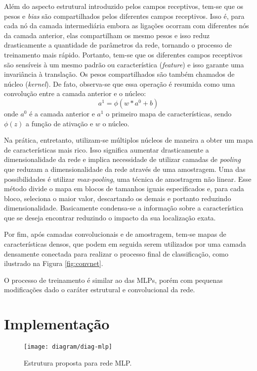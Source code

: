 Além do aspecto estrutural introduzido pelos campos receptivos, tem-se que os pesos e \textit{bias} são compartilhados pelos diferentes campos receptivos. Isso é, para cada nó da camada intermediária embora as ligações ocorram com diferentes nós da camada anterior, elas compartilham os mesmo pesos e isso reduz drasticamente a quantidade de parâmetros da rede, tornando o processo de treinamento mais rápido. Portanto, tem-se que os diferentes campos receptivos são sensíveis à um mesmo padrão ou característica (\textit{feature}) e isso garante uma invariância à translação. Os pesos compartilhados são também chamados de núcleo (\textit{kernel}). De fato, observa-se que essa operação é resumida como uma convolução entre a camada anterior e o núcleo:
\begin{equation}
a^1 = \phi(w \ast a^0 + b) 
\end{equation}
onde $a^0$ é a camada anterior e $a^1$ o primeiro mapa de características, sendo $\phi(z)$ a função de ativação e $w$ o núcleo.

Na prática, entretanto, utilizam-se múltiplos núcleos de maneira a obter um mapa de características mais rico. Isso significa aumentar drasticamente a dimensionalidade da rede e implica necessidade de utilizar camadas de \textit{pooling} que reduzam a dimensionalidade da rede através de uma amostragem. Uma das possibilidades é utilizar \textit{max-pooling}, uma técnica de amostragem não linear. Esse método divide o mapa em blocos de tamanhos iguais especificados e, para cada bloco, seleciona o maior valor, descartando os demais e portanto reduzindo dimensionalidade. Basicamente condensa-se a informação sobre a característica que se deseja encontrar reduzindo o impacto da sua localização exata.

Por fim, após camadas convolucionais e de amostragem, tem-se mapas de características densos, que podem em seguida serem utilizados por uma camada densamente conectada para realizar o processo final de classificação, como ilustrado na Figura \ref{fig:convnet}. 

O processo de treinamento é similar ao das MLPs, porém com pequenas modificações dado o caráter estrutural e convolucional da rede.

\section{Implementação}
\begin{figure}
\centering
\texttt{[image: diagram/diag-mlp]}
\caption{Estrutura proposta para rede MLP.}
\label{fig:diag-mlp}
\end{figure}

